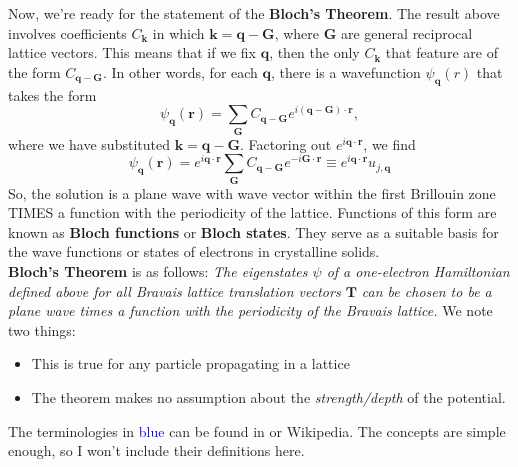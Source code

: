 \documentclass{book}
\theoremstyle{definition}
\begin{document}
Now, we're ready for the statement of the \textbf{Bloch's Theorem}. The result above involves coefficients $C_{\mathbf{k}}$ in which $\mathbf{k} = \mathbf{q} - \mathbf{G}$, where $\mathbf{G}$ are general reciprocal lattice vectors. This means that if we fix $\mathbf{q}$, then the only $C_\mathbf{k}$ that feature are of the form $C_{\mathbf{q} - \mathbf{G}}$. In other words, for each $\mathbf{q}$, there is a wavefunction $\psi_\mathbf{q}(r)$ that takes the form
\begin{equation*}
\psi_\mathbf{q}(\mathbf{r}) = \sum_\mathbf{G} C_{\mathbf{q} - \mathbf{G}} e^{i(\mathbf{q} - \mathbf{G})\cdot \mathbf{r}},
\end{equation*}
where we have substituted $\mathbf{k} = \mathbf{q} - \mathbf{G}$. Factoring out $e^{i\mathbf{q}\cdot \mathbf{r}}$, we find 
\begin{equation*}
\boxed{\psi_\mathbf{q}(\mathbf{r})  = e^{i\mathbf{q}\cdot \mathbf{r}} \sum_\mathbf{G} C_{\mathbf{q} - \mathbf{G}} e^{-i \mathbf{G}\cdot \mathbf{r}} \equiv e^{i\mathbf{q}\cdot\mathbf{r}}u_{j,\mathbf{q}}}
\end{equation*}
So, the solution is a plane wave with wave vector within the first Brillouin zone TIMES a function with the periodicity of the lattice. Functions of this form are known as \textbf{Bloch functions} or \textbf{Bloch states}. They serve as a suitable basis for the wave functions or states of electrons in crystalline solids. \\



\textbf{Bloch's Theorem} is as follows: \textit{The eigenstates $\psi$ of a one-electron Hamiltonian defined above for all Bravais lattice translation vectors $\mathbf{T}$ can be chosen to be a plane wave times a function with the periodicity of the Bravais lattice.} We note two things:
\begin{itemize}
	\item This is true for any particle propagating in a lattice
	\item The theorem makes no assumption about the \textit{strength/depth} of the potential. 
\end{itemize}








 The terminologies in \textcolor{blue}{blue} can be found in \cite{kittel1996introduction} or Wikipedia. The concepts are simple enough, so I won't include their definitions here. 
\end{document}
